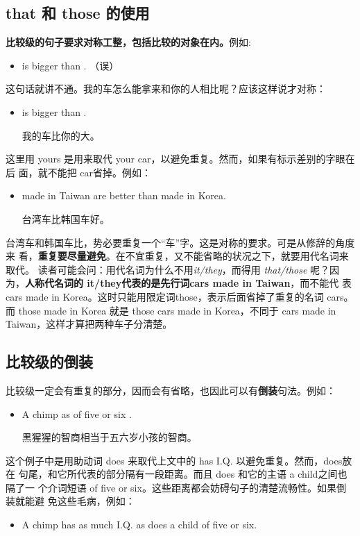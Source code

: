 \subsection{that 和 those 的使用}

\textbf{比较级的句子要求对称工整，包括比较的对象在内。}例如:
\begin{itemize}
\item  {} is bigger than . （误）
\end{itemize}
这句话就讲不通。我的车怎么能拿来和你的人相比呢？应该这样说才对称：
\begin{itemize}
\item  {} is bigger than .

  我的车比你的大。
\end{itemize}
这里用 yours 是用来取代 your car，以避免重复。然而，如果有标示差别的字眼在后
面，就不能把 car省掉。例如：
\begin{itemize}
\item  {} made in Taiwan are better than  made in Korea.

  台湾车比韩国车好。
\end{itemize}
台湾车和韩国车比，势必要重复一个“车”字。这是对称的要求。可是从修辞的角度来
看，\textbf{重复要尽量避免}。在不宜重复，又不能省略的状况之下，就要用代名词来取代。
读者可能会问：用代名词为什么不用\emph{it/they}，而得用 \emph{that/those} 呢？因
为，\textbf{人称代名词的 it/they代表的是先行词cars made in Taiwan}，而不能代
表 cars made in Korea。这时只能用限定词those，表示后面省掉了重复的名词 cars。
而 those made in Korea 就是 those cars made in Korea，不同于 cars made in
Taiwan，这样才算把两种车子分清楚。

\subsection{比较级的倒装}

比较级一定会有重复的部分，因而会有省略，也因此可以有\textbf{倒装}句法。例如：
\begin{itemize}
\item  A chimp  as  of five or six .

  黑猩猩的智商相当于五六岁小孩的智商。
\end{itemize}
这个例子中是用助动词 does 来取代上文中的 has I.Q. 以避免重复。然而，does放在
句尾，和它所代表的部分隔有一段距离。而且 does 和它的主语 a child之间也隔了一
个介词短语 of five or six。这些距离都会妨碍句子的清楚流畅性。如果倒装就能避
免这些毛病，例如：
\begin{itemize}
\item  A chimp has as much I.Q. as does a child of five or six.
\end{itemize}

